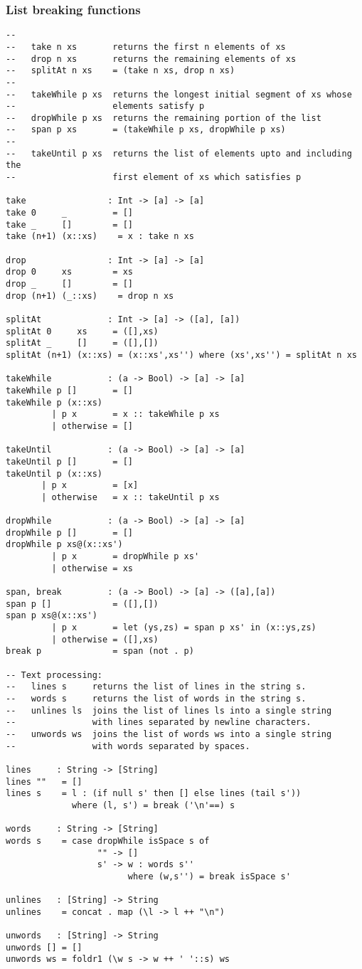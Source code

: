 \subsubsection*{List breaking functions}
\begin{verbatim}
--
--   take n xs       returns the first n elements of xs
--   drop n xs       returns the remaining elements of xs
--   splitAt n xs    = (take n xs, drop n xs)
--
--   takeWhile p xs  returns the longest initial segment of xs whose
--                   elements satisfy p
--   dropWhile p xs  returns the remaining portion of the list
--   span p xs       = (takeWhile p xs, dropWhile p xs)
--
--   takeUntil p xs  returns the list of elements upto and including the
--                   first element of xs which satisfies p

take                : Int -> [a] -> [a]
take 0     _         = []
take _     []        = []
take (n+1) (x::xs)    = x : take n xs

drop                : Int -> [a] -> [a]
drop 0     xs        = xs
drop _     []        = []
drop (n+1) (_::xs)    = drop n xs

splitAt             : Int -> [a] -> ([a], [a])
splitAt 0     xs     = ([],xs)
splitAt _     []     = ([],[])
splitAt (n+1) (x::xs) = (x::xs',xs'') where (xs',xs'') = splitAt n xs

takeWhile           : (a -> Bool) -> [a] -> [a]
takeWhile p []       = []
takeWhile p (x::xs)
         | p x       = x :: takeWhile p xs
         | otherwise = []

takeUntil           : (a -> Bool) -> [a] -> [a]
takeUntil p []       = []
takeUntil p (x::xs)
       | p x         = [x]
       | otherwise   = x :: takeUntil p xs

dropWhile           : (a -> Bool) -> [a] -> [a]
dropWhile p []       = []
dropWhile p xs@(x::xs')
         | p x       = dropWhile p xs'
         | otherwise = xs

span, break         : (a -> Bool) -> [a] -> ([a],[a])
span p []            = ([],[])
span p xs@(x::xs')
         | p x       = let (ys,zs) = span p xs' in (x::ys,zs)
         | otherwise = ([],xs)
break p              = span (not . p)

-- Text processing:
--   lines s     returns the list of lines in the string s.
--   words s     returns the list of words in the string s.
--   unlines ls  joins the list of lines ls into a single string
--               with lines separated by newline characters.
--   unwords ws  joins the list of words ws into a single string
--               with words separated by spaces.

lines     : String -> [String]
lines ""   = []
lines s    = l : (if null s' then [] else lines (tail s'))
             where (l, s') = break ('\n'==) s

words     : String -> [String]
words s    = case dropWhile isSpace s of
                  "" -> []
                  s' -> w : words s''
                        where (w,s'') = break isSpace s'

unlines   : [String] -> String
unlines    = concat . map (\l -> l ++ "\n")

unwords   : [String] -> String
unwords [] = []
unwords ws = foldr1 (\w s -> w ++ ' '::s) ws
\end{verbatim}
